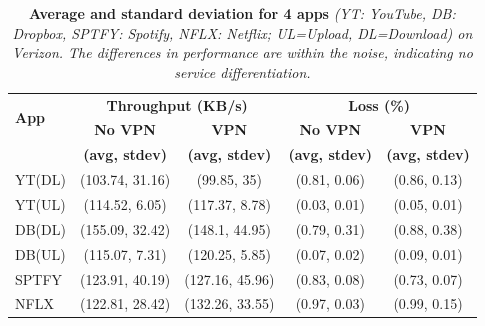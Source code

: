  \begin{table}
\centering
\begin{small}
\begin{tabular}{|p{}|c|c|c|c|}
\hline
\multirow{2}{*}{\bf App} & \multicolumn{2}{c|}{\bf Throughput (KB/s)} &  \multicolumn{2}{c|}{\bf Loss (\%)} \tabularnewline
\cline{2-5}
                              & {\bf No VPN}  & {\bf VPN} & {\bf No VPN} & {\bf VPN}   \tabularnewline
                              & {\bf (avg, stdev)}  & {\bf (avg, stdev)} & {\bf (avg, stdev)} & {\bf (avg, stdev)}   \tabularnewline
\hline

YT(DL) & (103.74, 31.16) & (99.85, 35) & (0.81, 0.06) & (0.86, 0.13) \tabularnewline
\hline
YT(UL) & (114.52, 6.05) & (117.37, 8.78) & (0.03, 0.01) & (0.05, 0.01) \tabularnewline
\hline
DB(DL)  & (155.09, 32.42) & (148.1, 44.95) & (0.79, 0.31) & (0.88, 0.38) \tabularnewline
\hline
DB(UL) & (115.07, 7.31) & (120.25, 5.85) & (0.07, 0.02) & (0.09, 0.01) \tabularnewline
\hline
SPTFY & (123.91, 40.19) & (127.16, 45.96) & (0.83, 0.08) & (0.73, 0.07) \tabularnewline
\hline
NFLX & (122.81, 28.42) & (132.26, 33.55) & (0.97, 0.03) & (0.99, 0.15) \tabularnewline
\hline
\end{tabular}
\end{small}
\caption{ \textbf{Average and standard deviation for 4  apps } \emph{(YT: YouTube, DB: Dropbox, SPTFY: Spotify, NFLX: Netflix; UL=Upload, DL=Download) on 
Verizon. The differences in performance are within the noise, indicating no service differentiation. }}
\label{tab:svcdiff}
\vspace{\postfigspace}
\end{table}

%


